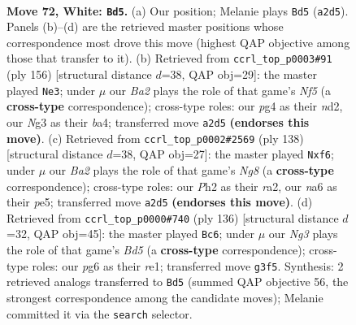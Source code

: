 \documentclass[11pt]{article}
\begin{document}
\clearpage

\begin{figure}[p]\centering
\begin{subfigure}{0.46\textwidth}\centering
\resizebox{\linewidth}{!}{%
\newchessgame
\chessboard[
  setfen={8/2r2p2/n5p1/4P2p/b4Pp1/3k2N1/B4K1P/8 w - - 2 72},
  showmover=false,
  pgfstyle=straightmove, color=movearrow, markmove={a2-d5}
]}
\caption{}
\end{subfigure}\hfill
\begin{subfigure}{0.46\textwidth}\centering
\resizebox{\linewidth}{!}{%
\newchessgame
\chessboard[
  setfen={3B4/p7/kp6/4pN2/b1p3P1/P1P5/2Pn2K1/8 w - - 1 79},
  showmover=false,
  pgfstyle=straightmove, color=movearrow, markmove={f5-e3}
]}
\caption{}
\end{subfigure}
\\[4pt]
\begin{subfigure}{0.46\textwidth}\centering
\resizebox{\linewidth}{!}{%
\newchessgame
\chessboard[
  setfen={6N1/2R5/p4p2/1k2p1pP/4P1P1/8/r6n/3K4 w - - 2 70},
  showmover=false,
  pgfstyle=straightmove, color=movearrow, markmove={g8-f6}
]}
\caption{}
\end{subfigure}\hfill
\begin{subfigure}{0.46\textwidth}\centering
\resizebox{\linewidth}{!}{%
\newchessgame
\chessboard[
  setfen={8/5pk1/1p4p1/3B3p/P4N1P/6P1/7K/4r3 w - - 1 69},
  showmover=false,
  pgfstyle=straightmove, color=movearrow, markmove={d5-c6}
]}
\caption{}
\end{subfigure}
\caption{\textbf{Move 72, White: \texttt{Bd5}.} (a) Our position; Melanie plays \texttt{Bd5} (\texttt{a2d5}). Panels (b)--(d) are the retrieved master positions whose correspondence most drove this move (highest QAP objective among those that transfer to it). (b) Retrieved from \texttt{ccrl\_top\_p0003\#91} (ply 156) [structural distance $d$=38, QAP obj=29]: the master played \texttt{Ne3}; under $\mu$ our \emph{Ba2} plays the role of that game's \emph{Nf5} (a \textbf{cross-type} correspondence); cross-type roles: our \emph{p}g4 as their \emph{n}d2, our \emph{N}g3 as their \emph{b}a4; transferred move \texttt{a2d5} \textbf{(endorses this move)}. (c) Retrieved from \texttt{ccrl\_top\_p0002\#2569} (ply 138) [structural distance $d$=38, QAP obj=27]: the master played \texttt{Nxf6}; under $\mu$ our \emph{Ba2} plays the role of that game's \emph{Ng8} (a \textbf{cross-type} correspondence); cross-type roles: our \emph{P}h2 as their \emph{r}a2, our \emph{n}a6 as their \emph{p}e5; transferred move \texttt{a2d5} \textbf{(endorses this move)}. (d) Retrieved from \texttt{ccrl\_top\_p0000\#740} (ply 136) [structural distance $d$=32, QAP obj=45]: the master played \texttt{Bc6}; under $\mu$ our \emph{Ng3} plays the role of that game's \emph{Bd5} (a \textbf{cross-type} correspondence); cross-type roles: our \emph{p}g6 as their \emph{r}e1; transferred move \texttt{g3f5}. Synthesis: 2 retrieved analogs transferred to \texttt{Bd5} (summed QAP objective 56, the strongest correspondence among the candidate moves); Melanie committed it via the \texttt{search} selector.}
\label{fig:thought-m142}
\end{figure}
\end{document}
